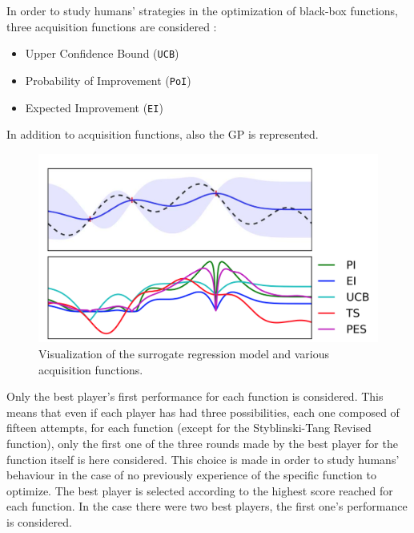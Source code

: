 In order to study humans' strategies in the optimization of black-box functions, three acquisition functions are considered :

\begin{itemize}
	\item Upper Confidence Bound ({\tt UCB}) \cite{DBLP:journals/pieee/ShahriariSWAF16}
	\item Probability of Improvement ({\tt PoI}) \cite{DBLP:journals/pieee/ShahriariSWAF16}
	\item Expected Improvement ({\tt EI}) \cite{DBLP:journals/pieee/ShahriariSWAF16}
\end{itemize}

In addition to acquisition functions, also the GP is represented. \\ 

\begin{figure} [h!]
	\centering
	\includegraphics[width=\linewidth]{IMAGES/Surrogate}
	\caption{Visualization of the surrogate regression model and various acquisition functions\cite{DBLP:journals/pieee/ShahriariSWAF16}.}
	\label{fig:surrogate}
\end{figure}

Only the best player's first performance for each function is considered. This means that even if each player has had three possibilities, each one composed of fifteen attempts, for each function (except for the Styblinski-Tang Revised function), only the first one of the three rounds made by the best player for the function itself is here considered. This choice is made in order to study humans' behaviour in the case of no previously experience of the specific function to optimize. The best player is selected according to the highest score reached for each function. In the case there were two best players, the first one's performance is considered.  \\

